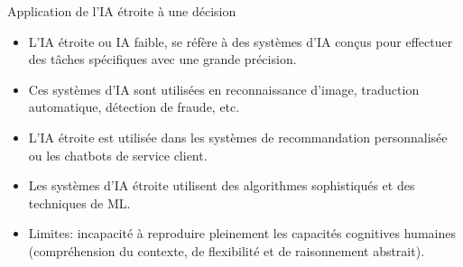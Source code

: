 \documentclass{beamer}
\begin{document}
\begin{frame}{Application de l'IA étroite à une décision}
	\begin{itemize}
		\item L'IA étroite ou IA faible, se réfère à des systèmes d'IA conçus pour effectuer des tâches spécifiques avec une grande précision.
		\item Ces systèmes d'IA sont utilisées en reconnaissance d'image, traduction automatique, détection de fraude, etc.
		\item L'IA étroite est utilisée dans les systèmes de recommandation personnalisée ou les chatbots de service client.
		\item Les systèmes d'IA étroite utilisent des algorithmes sophistiqués et des techniques de ML.
		\item Limites: incapacité à reproduire pleinement les capacités cognitives humaines (compréhension du contexte, de flexibilité et de raisonnement abstrait).
	\end{itemize}
\end{frame}
\end{document}
